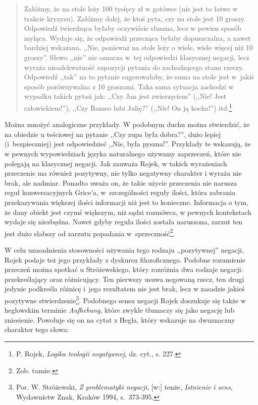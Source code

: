\begin{quote}
    Załóżmy, że na stole leży 100 tysięcy zł w gotówce (nie jest to łatwe w
trakcie kryzysu). Załóżmy dalej, że ktoś pyta, czy na stole jest 10
groszy. Odpowiedź twierdząca byłaby oczywiście słuszna, lecz w pewien
sposób myląca. Wydaje się, że odpowiedź przecząca byłaby dopuszczalna,
a nawet bardziej wskazana. ,,Nie, ponieważ na stole leży o wiele, wiele
więcej niż 10 groszy''. Słowo ,,nie'' nie oznacza w~tej odpowiedzi
klasycznej negacji, lecz wyraża nieadekwatność supozycji pytania do
zachodzącego stanu rzeczy. Odpowiedź ,,tak'' na to pytanie sugerowałaby,
że suma na stole jest w~jakiś sposób porównywalna z 10 groszami. Taka
sama sytuacja zachodzi w wypadku takich pytań jak: ,,Czy Jan jest
zwierzęciem'' (,,Nie! Jest człowiekiem!''), ,,Czy Romeo lubi Julię?'' (,,Nie!
On ją kocha!'') itd.\footnote{P. Rojek, \textit{Logika teologii negatywnej}, dz. cyt., s. 227. }
\end{quote}






Można mnożyć analogiczne przykłady. W podobnym duchu można stwierdzić,
że na obiedzie u teściowej na pytanie ,,Czy zupa była dobra?'', dużo
lepiej (i~bezpieczniej) jest odpowiedzieć ,,Nie, była pyszna!''.
Przykłady te wskazują, że w pewnych wypowiedziach  języka naturalnego
używamy zaprzeczeń, które nie polegają na klasycznej negacji. Jak
zauważa Rojek, w takich wyrażeniach przeczenie ma również pozytywny, nie tylko negatywny
charakter i wyraża nie brak, ale nadmiar. Ponadto uważa on, że takie
użycie przeczenia nie narusza reguł konwersacyjnych Grice'a, w~szczególności reguły ilości, która zabrania przekazywania większej
ilości informacji niż jest to konieczne. Informacja o tym, że dany
obiekt jest czymś większym, niż sądzi rozmówca, w pewnych kontekstach
wydaje się niezbędna. Nawet gdyby reguła ilości została naruszona,
zarzut ten jest dużo słabszy od zarzutu popadania w~sprzeczność\footnote{Zob. tamże.}.

W celu uzasadnienia stosowności używania tego rodzaju ,,pozytywnej''
negacji, Rojek podaje też jego przykłady z dyskursu filozoficznego.
Podobne rozumienie przeczeń  można spotkać u Stróżewskiego, który
rozróżnia dwa rodzaje negacji: przekreślający oraz różnicujący. Ten
pierwszy usuwa negowaną rzecz, ten drugi jedynie podkreśla różnicę i~jego
rezultatem nie jest brak, lecz w zasadzie jakieś pozytywne
stwierdzenie\footnote{Por. W. Stróżewski, \textit{Z problematyki negacji}, [w:]
tenże, \textit{Istnienie i sens}, Wydawnictw Znak, Kraków 1994,
s.~373-395.}. Podobnego sensu negacji Rojek doszukuje się także
w heglowskim terminie \textit{Aufhebung}, które zwykle tłumaczy się
jako negację lub zniesienie. Powołuje się on na cytat z Hegla, który
wskazuje na dwuznaczny charakter tego słowa:

